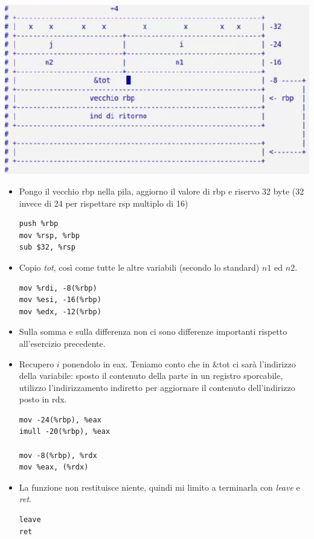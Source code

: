 \documentclass[11pt]{report}
\theoremstyle{definition}
\begin{document}
\begin{center}
\includegraphics{img/35.PNG}
\end{center}
\begin{itemize}
\item Pongo il vecchio rbp nella pila, aggiorno il valore di rbp e riservo 32 byte (32 invece di 24 per rispettare rsp multiplo di 16)
\begin{verbatim}
push %rbp
mov %rsp, %rbp
sub $32, %rsp
\end{verbatim}
\item Copio \emph{tot}, così come tutte le altre variabili (secondo lo standard) $n1$ ed $n2$.
\begin{verbatim}
mov %rdi, -8(%rbp)
mov %esi, -16(%rbp)
mov %edx, -12(%rbp)
\end{verbatim}
\item Sulla somma e sulla differenza non ci sono differenze importanti rispetto all'esercizio precedente.
\item Recupero $i$ ponendolo in eax. Teniamo conto che in \&tot ci sarà l'indirizzo della variabile: sposto il contenuto della parte in un registro sporcabile, utilizzo l'indirizzamento indiretto per aggiornare il contenuto dell'indirizzo posto in rdx.
\begin{verbatim}
mov -24(%rbp), %eax
imull -20(%rbp), %eax

mov -8(%rbp), %rdx
mov %eax, (%rdx)
\end{verbatim}
\item La funzione non restituisce niente, quindi mi limito a terminarla con \emph{leave} e \emph{ret}.
\begin{verbatim}
leave
ret
\end{verbatim}
\end{itemize}
\end{document}

